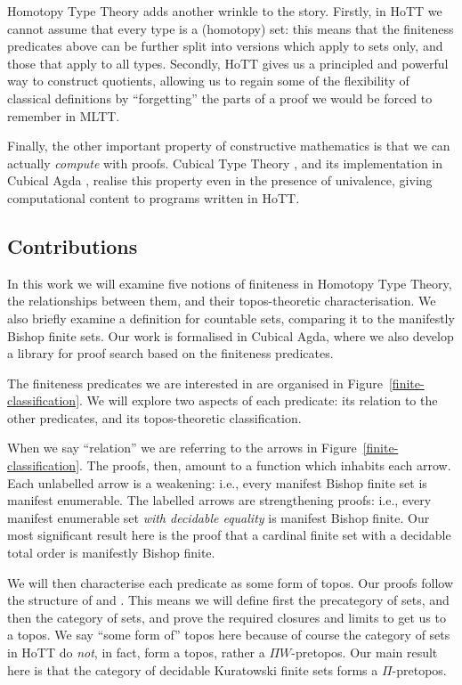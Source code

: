 Homotopy Type Theory \cite{hottbook} adds another wrinkle to the story.
Firstly, in HoTT we cannot assume that every type is a (homotopy) set: this
means that the finiteness predicates above can be further split into versions
which apply to sets only, and those that apply to all types.
Secondly, HoTT gives us a principled and powerful way to construct quotients,
allowing us to regain some of the flexibility of classical definitions by
``forgetting'' the parts of a proof we would be forced to remember in MLTT.

Finally, the other important property of constructive mathematics is that we can
actually \emph{compute} with proofs.
Cubical Type Theory \cite{cohenCubicalTypeTheory2016}, and its implementation in
Cubical Agda \cite{vezzosiCubicalAgdaDependently2019}, realise this property
even in the presence of univalence, giving computational content to programs
written in HoTT.
\subsection{Contributions}
In this work we will examine five notions of finiteness in Homotopy Type Theory,
the relationships between them, and their topos-theoretic characterisation.
We also briefly examine a definition for countable sets, comparing it to the
manifestly Bishop finite sets.
Our work is formalised in Cubical Agda, where we also develop a library for
proof search based on the finiteness predicates.



The finiteness predicates we are interested in are organised in
Figure~\ref{finite-classification}.
We will explore two aspects of each predicate: its relation to the other
predicates, and its topos-theoretic classification.

When we say ``relation'' we are referring to the arrows in
Figure~\ref{finite-classification}.
The proofs, then, amount to a function which inhabits each arrow.
Each unlabelled arrow is a weakening: i.e., every manifest Bishop finite set
is manifest enumerable.
The labelled arrows are strengthening proofs: i.e., every manifest enumerable set
\emph{with decidable equality} is manifest Bishop finite.
Our most significant result here is the proof that a cardinal finite set with a
decidable total order is manifestly Bishop finite.

We will then characterise each predicate as some form of topos.
Our proofs follow the structure of \cite[Chapters 9, 10]{hottbook} and
\cite{rijkeSetsHomotopyType2015}.
This means we will define first the precategory of sets, and then the category
of sets, and prove the required closures and limits to get us to a topos.
We say ``some form of'' topos here because of course the category of sets in
HoTT do \emph{not}, in fact, form a topos, rather a \(\Pi W\)-pretopos.
Our main result here is that the category of decidable Kuratowski finite sets
forms a \(\Pi\)-pretopos.

